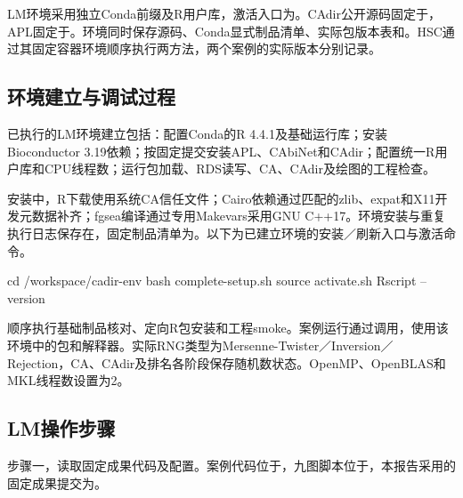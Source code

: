 LM环境采用独立Conda前缀及R用户库，激活入口为\texttt{\fontsize{10}{12}\selectfont{}}。CAdir公开源码固定于\texttt{\fontsize{10}{12}\selectfont{}}，APL固定于\texttt{\fontsize{10}{12}\selectfont{}}。环境同时保存源码、Conda显式制品清单、实际包版本表和\texttt{\fontsize{10}{12}\selectfont{}}。HSC通过其固定容器环境顺序执行两方法，两个案例的实际版本分别记录。

\subsection{环境建立与调试过程}
已执行的LM环境建立包括：配置Conda的R 4.4.1及基础运行库；安装Bioconductor 3.19依赖；按固定提交安装APL、CAbiNet和CAdir；配置统一R用户库和CPU线程数；运行包加载、RDS读写、CA、CAdir及绘图的工程检查。

安装中，R下载使用系统CA信任文件\texttt{\fontsize{10}{12}\selectfont{}}；Cairo依赖通过匹配的zlib、expat和X11开发元数据补齐；fgsea编译通过专用Makevars采用GNU C++17。环境安装与重复执行日志保存在\texttt{\fontsize{10}{12}\selectfont{}}，固定制品清单为\texttt{\fontsize{10}{12}\selectfont{}}。以下为已建立环境的安装／刷新入口与激活命令。

\begin{ReportCode}
cd /workspace/cadir-env
bash complete-setup.sh
source activate.sh
Rscript --version
\end{ReportCode}

\texttt{\fontsize{10}{12}\selectfont{}}顺序执行基础制品核对、定向R包安装和工程smoke。案例运行通过\texttt{\fontsize{10}{12}\selectfont{}}调用\texttt{\fontsize{10}{12}\selectfont{}}，使用该环境中的包和解释器。实际RNG类型为Mersenne-Twister／Inversion／Rejection，CA、CAdir及排名各阶段保存随机数状态。OpenMP、OpenBLAS和MKL线程数设置为\allowbreak{}2。

\subsection{LM操作步骤}
步骤一，读取固定成果代码及配置。案例代码位于\texttt{\fontsize{10}{12}\selectfont{}}，九图脚本位于\texttt{\fontsize{10}{12}\selectfont{}}，本报告采用的固定成果提交为\texttt{\fontsize{10}{12}\selectfont{}}。

